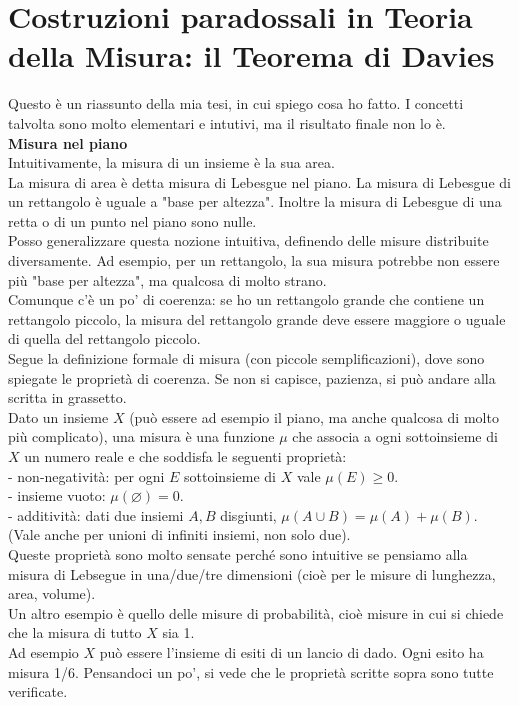 \documentclass[11pt]{article}
\newcommand{\<}{\langle}
\renewcommand{\>}{\rangle}
\begin{document}
	

	\section*{Costruzioni paradossali in Teoria della Misura: il Teorema di Davies}
	Questo è un riassunto della mia tesi, in cui spiego cosa ho fatto. I concetti talvolta sono molto elementari e intutivi, ma il risultato finale non lo è.\\
	
	\textbf{Misura nel piano}\\
	Intuitivamente, la misura di un insieme è la sua area.\\
	La misura di area è detta misura di Lebesgue nel piano. La misura di Lebesgue di un rettangolo è uguale a "base per altezza". Inoltre la misura di Lebesgue di una retta o di un punto nel piano sono nulle.\\
	Posso generalizzare questa nozione intuitiva, definendo delle misure distribuite diversamente. Ad esempio, per un rettangolo, la sua misura potrebbe non essere più "base per altezza", ma qualcosa di molto strano.\\
	Comunque c'è un po' di coerenza: se ho un rettangolo grande che contiene un rettangolo piccolo, la misura del rettangolo grande deve essere maggiore o uguale di quella del rettangolo piccolo.\\

	Segue la definizione formale di misura (con piccole semplificazioni), dove sono spiegate le proprietà di coerenza. Se non si capisce, pazienza, si può andare alla scritta in grassetto.\\
	Dato un insieme $X$ (può essere ad esempio il piano, ma anche qualcosa di molto più complicato), una misura è una funzione $\mu$ che associa a ogni sottoinsieme di $X$ un numero reale e che soddisfa le seguenti proprietà:\\
	- non-negatività: per ogni $E$ sottoinsieme di $X$ vale $\mu(E)\geq0$.\\
	- insieme vuoto: $ \mu (\varnothing )=0$.\\
	- additività: dati due insiemi $A,B$ disgiunti, $\mu(A \cup B)= \mu (A)+ \mu(B)$. (Vale anche per unioni di infiniti insiemi, non solo due).\\
	
	Queste proprietà sono molto sensate perché sono intuitive se pensiamo alla misura di Lebsegue in una/due/tre dimensioni (cioè per le misure di lunghezza, area, volume).\\
	Un altro esempio è quello delle misure di probabilità, cioè misure in cui si chiede che la misura di tutto $X$ sia 1.\\
	Ad esempio $X$ può essere l'insieme di esiti di un lancio di dado. Ogni esito ha misura 1/6. Pensandoci un po', si vede che le proprietà scritte sopra sono tutte verificate.\\
\end{document}

